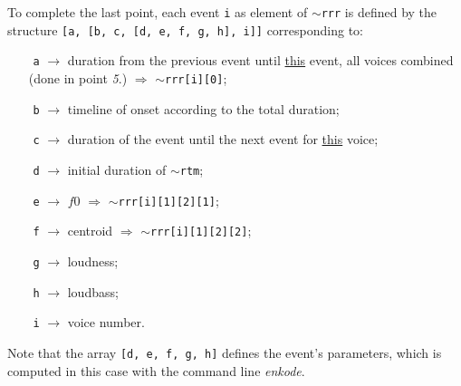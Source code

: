 \noindent To complete the last point,  each event \texttt{i} as element of  \texttt{$\sim$rrr} is defined by the structure  \texttt{[a, [b, c, [d, e, f, g, h], i]]}  corresponding to:
 
  \begin{itemize}
\item[$ $] \texttt{a} $\rightarrow$ duration from the previous event until \underline{this} event, all voices combined (done in point \textit{5}.) $\Rightarrow$ \texttt{$\sim$rrr[i][0]};
\item[$ $] \texttt{b} $\rightarrow$ timeline of onset according to the total duration;
\item[$ $] \texttt{c} $\rightarrow$ duration of the event until the next event for \underline{this} voice;
\item[$ $] \texttt{d} $\rightarrow$ initial duration of  \texttt{$\sim$rtm};
\item[$ $] \texttt{e} $\rightarrow$ $f0$ $\Rightarrow$ \texttt{$\sim$rrr[i][1][2][1]};
\item[$ $] \texttt{f} $\rightarrow$ centroid $\Rightarrow$ \texttt{$\sim$rrr[i][1][2][2]};
\item[$ $] \texttt{g} $\rightarrow$ loudness;
\item[$ $] \texttt{h} $\rightarrow$ loudbass;
\item[$ $] \texttt{i} $\rightarrow$ voice number.
 \end{itemize}
 
 Note that the array \texttt{[d, e, f, g, h]} defines the event's parameters, which is computed  in this case with the command line \textsl{enkode}. 